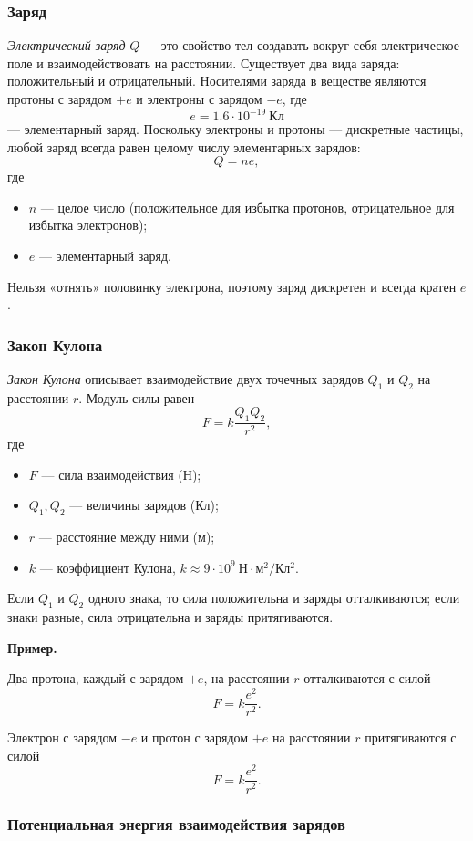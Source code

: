\documentclass[12pt, a4paper]{article}%
\begin{document}
\subsubsection*{Заряд}

\textit{Электрический заряд} $Q$ — это свойство тел создавать вокруг себя электрическое поле и взаимодействовать на расстоянии. Существует два вида заряда: положительный и отрицательный. Носителями заряда в веществе являются протоны с зарядом $+e$ и электроны с зарядом $-e$, где  
\[
e = 1.6\cdot10^{-19}\ \mathrm{Кл}
\]  
— элементарный заряд. Поскольку электроны и протоны — дискретные частицы, любой заряд всегда равен целому числу элементарных зарядов:
\[
Q = ne,
\]
где  
\begin{itemize}
  \item $n$ — целое число (положительное для избытка протонов, отрицательное для избытка электронов);
  \item $e$ — элементарный заряд.
\end{itemize}
Нельзя «отнять» половинку электрона, поэтому заряд дискретен и всегда кратен $e$.

\subsubsection*{Закон Кулона}
\textit{Закон Кулона} описывает взаимодействие двух точечных зарядов $Q_{1}$ и $Q_{2}$ на расстоянии $r$. Модуль силы равен  
\[
F = k \frac{Q_{1} Q_{2}}{r^{2}},
\]
где  
\begin{itemize}
  \item $F$ — сила взаимодействия (Н);
  \item $Q_{1}, Q_{2}$ — величины зарядов (Кл);
  \item $r$ — расстояние между ними (м);
  \item $k$ — коэффициент Кулона, $k\approx9\cdot10^{9}\ \mathrm{Н\cdot м^{2}/Кл^{2}}$.
\end{itemize}
Если $Q_{1}$ и $Q_{2}$ одного знака, то сила положительна и заряды отталкиваются; если знаки разные, сила отрицательна и заряды притягиваются.

\textbf{Пример.}

Два протона, каждый с зарядом $+e$, на расстоянии $r$ отталкиваются с силой  
\[
F = k \frac{e^{2}}{r^{2}}.
\]

Электрон с зарядом $-e$ и протон с зарядом $+e$ на расстоянии $r$ притягиваются с силой  
\[
F = k \frac{e^{2}}{r^{2}}.
\]

\subsubsection*{Потенциальная энергия взаимодействия зарядов}
\end{document}
